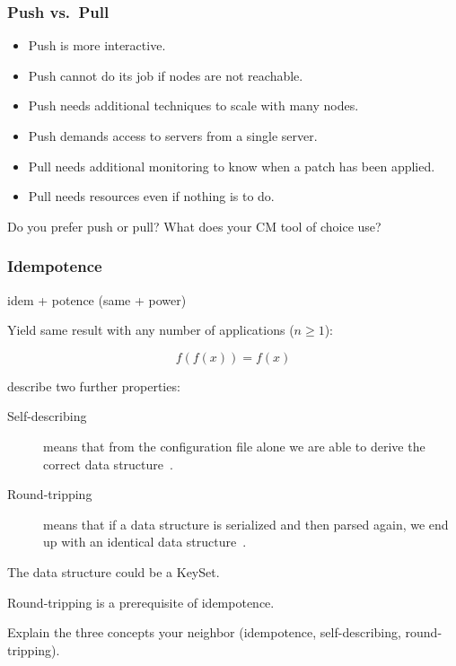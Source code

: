 
\begin{frame}
	\frametitle{Push vs.\ Pull}

	\begin{itemize}[<+-| alert@+>]
	\item Push is more interactive.
	\item Push cannot do its job if nodes are not reachable.
	\item Push needs additional techniques to scale with many nodes.
	\item Push demands access to servers from a single server.
	\item Pull needs additional monitoring to know when a patch has been applied.
	\item Pull needs resources even if nothing is to do.
	\end{itemize}

	\begin{task}
	Do you prefer push or pull?
	What does your CM tool of choice use?
	\end{task}
\end{frame}


\begin{frame}
	\frametitle{Idempotence}

	idem + potence (same + power)
	\vspace{2em}

	Yield same result with any number of applications ($n\ge1$):
		
	\[
		f(f(x))=f(x)
	\]
\end{frame}


\begin{frame}
	\citet{wadler2003xml} describe two further properties:
	\vspace{2em}

	\begin{description}
	\item[Self-describing]
	means that from the configuration file alone we are able to derive the correct data structure~\cite{wadler2003xml}.

	\item[Round-tripping]
	means that if a data structure is serialized and then parsed again, we end up with an identical data structure~\cite{wadler2003xml}.
	\end{description}

	The data structure could be a KeySet.

	\pause

	\vspace{2em}
	Round-tripping is a prerequisite of idempotence.

	\pause

	\begin{task}
	Explain the three concepts your neighbor (idempotence, self-describing, round-tripping).
	\end{task}
\end{frame}


